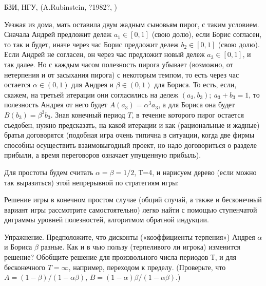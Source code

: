 \begin{problem}
\begin{source}
БЗИ, НГУ, (A.Rubinstein,   {?1982?}, \cite{miller:gtw})
\end{source}

Уезжая из дома, мать оставила двум жадным сыновьям пирог, с
таким условием. Сначала Андрей предложит дележ $a_1\in
[0,1]$ (свою долю), если Борис согласен, то так и будет,
иначе через час Борис предложит дележ $b_2\in [0,1]$ (свою
долю). Если Андрей не согласен, он через час предложит
новый дележ $a_3\in [0,1]$, и так далее. Но с каждым часом
полезность пирога убывает (возможно, от нетерпения и от
засыхания пирога) с некоторым темпом, то есть через час
остается $\alpha\in (0,1)$ для Андрея и $\beta\in (0,1)$
для Бориса. То есть, если, скажем, на третьей итерации они
согласились на дележ $(a_3, b_3); ~ a_3+ b_3=1$, то
полезность Андрея от него будет $A(a_3)=\alpha^3 a_3$, а для
Бориса она будет $B(b_3)=\beta^3 b_3$. Зная конечный период $T$, в течение
которого пирог остается съедобен, нужно предсказать, на
какой итерации и как (рациональные и жадные) братья
договорятся (подобная игра очень типична в ситуации, когда
две фирмы способны осуществить взаимовыгодный проект, но
надо договориться о разделе прибыли, а время переговоров
означает упущенную прибыль).

Для простоты будем считать $\alpha = \beta =1/2$, Т=4, и
нарисуем дерево (если можно так выразиться) этой
непрерывной по стратегиям игры:

Решение игры в конечном простом случае (общий случай, а также и
бесконечный вариант игры рассмотрите самостоятельно) легко
найти с помощью ступенчатой диграммы уровней полезностей,
алгоритмом обратной индукции.

Упражнение. Предположите, что дисконты («коэффициенты
терпения») Андрея $\alpha$ и Бориса $\beta$ разные. Как и в
чью пользу (терпеливого ли игрока) изменится решение? Обобщите
решение для произвольного числа периодов Т, и для
бесконечного $T=\infty$, например, переходом к пределу.
(Проверьте, что $A=(1-\beta)/(1-\alpha\beta)$,
$B=(1-\alpha)\beta/(1-\alpha\beta)$.)



\begin{sol}

\end{sol}
\end{problem}







